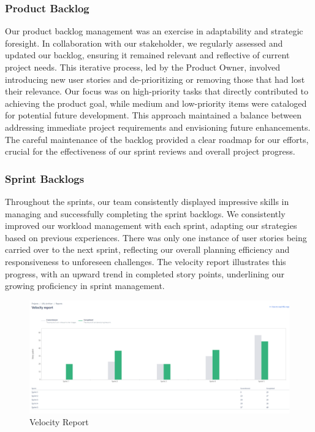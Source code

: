 \subsubsection{Product Backlog}
Our product backlog management was an exercise in adaptability and strategic foresight.
In collaboration with our stakeholder, we regularly assessed and updated our backlog, ensuring it remained relevant and reflective of current project needs.
This iterative process, led by the Product Owner, involved introducing new user stories and de-prioritizing or removing those that had lost their relevance.
Our focus was on high-priority tasks that directly contributed to achieving the product goal, while medium and low-priority items were cataloged for potential future development.
This approach maintained a balance between addressing immediate project requirements and envisioning future enhancements.
The careful maintenance of the backlog provided a clear roadmap for our efforts, crucial for the effectiveness of our sprint reviews and overall project progress.

\subsubsection{Sprint Backlogs}
Throughout the sprints, our team consistently displayed impressive skills in managing and successfully completing the sprint backlogs.
We consistently improved our workload management with each sprint, adapting our strategies based on previous experiences.
There was only one instance of user stories being carried over to the next sprint, reflecting our overall planning efficiency and responsiveness to unforeseen challenges.
The velocity report illustrates this progress, with an upward trend in completed story points, underlining our growing proficiency in sprint management.
\begin{figure}[h!]
    \centering
    \includegraphics[width=1\textwidth]{pictures/Scrum/velocity_report}
    \caption{Velocity Report}
    \label{fig:velocity_report}
\end{figure}

